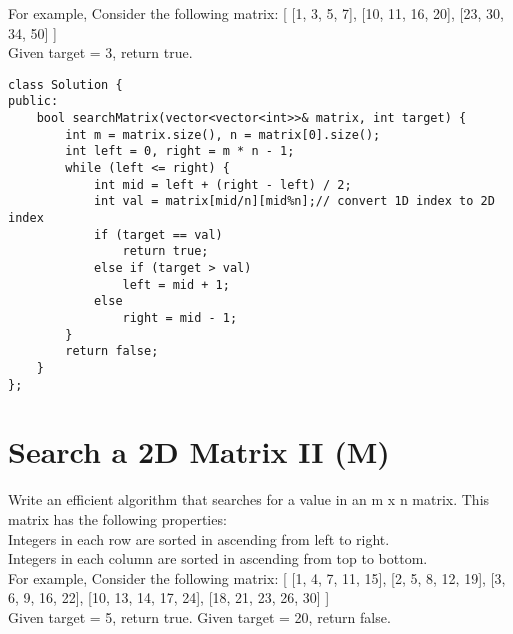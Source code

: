 For example,
Consider the following matrix:
[
  [1,   3,  5,  7],
  [10, 11, 16, 20],
  [23, 30, 34, 50]
]\\
Given target = 3, return true.\\

\begin{lstlisting}
class Solution {
public:
    bool searchMatrix(vector<vector<int>>& matrix, int target) {
        int m = matrix.size(), n = matrix[0].size();
        int left = 0, right = m * n - 1;
        while (left <= right) {
            int mid = left + (right - left) / 2;
            int val = matrix[mid/n][mid%n];// convert 1D index to 2D index
            if (target == val)
                return true;
            else if (target > val)
                left = mid + 1;
            else
                right = mid - 1;
        }
        return false;
    }
};
\end{lstlisting}


\section{Search a 2D Matrix II (M)}
Write an efficient algorithm that searches for a value in an m x n matrix. This matrix has the following properties:\\
    Integers in each row are sorted in ascending from left to right.\\
    Integers in each column are sorted in ascending from top to bottom.\\

For example,
Consider the following matrix:
[
  [1,   4,  7, 11, 15],
  [2,   5,  8, 12, 19],
  [3,   6,  9, 16, 22],
  [10, 13, 14, 17, 24],
  [18, 21, 23, 26, 30]
]\\
Given target = 5, return true. Given target = 20, return false.\\

